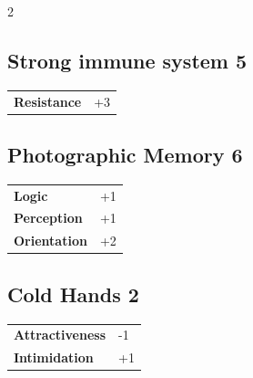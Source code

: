 \begin{multicols}{2}
\begin{tcolorbox}
\end{tcolorbox}

\begin{tcolorbox}
    \subsection*{Strong immune system \hfill \small{5 }}
    \tcblower




\begin{tabular}{@{}ll@{}}
    \textbf{Resistance} & +3\\
\end{tabular}


\end{tcolorbox}

\begin{tcolorbox}
    \subsection*{Photographic Memory \hfill \small{6 }}
    \tcblower




\begin{tabular}{@{}ll@{}}
    \textbf{Logic} & +1\\
    \textbf{Perception} & +1\\
    \textbf{Orientation} & +2\\
\end{tabular}


\end{tcolorbox}

\begin{tcolorbox}
    \subsection*{Cold Hands \hfill \small{2 }}
    \tcblower




\begin{tabular}{@{}ll@{}}
    \textbf{Attractiveness} & -1\\
    \textbf{Intimidation} & +1\\
\end{tabular}


\end{tcolorbox}
\end{multicols}

